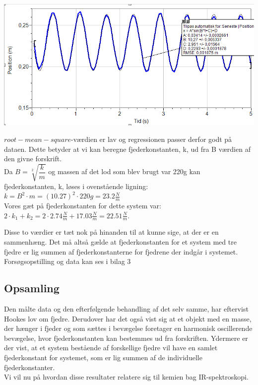 \begin{center}
\includegraphics[scale=0.7]{Billeder/graf4}
\end{center}

$root-mean-square$-værdien er lav og regressionen passer derfor godt på dataen. Dette betyder at vi kan beregne fjederkonstanten, k, ud fra B værdien af den givne forskrift.
\\

Da $B=\sqrt[2]{\dfrac{k}{m}}$ og massen af det lod som blev brugt var 220g kan fjederkonstanten, k, løses i ovenstående ligning:
\\

$k=B^2 \cdot m = (10.27)^2 \cdot 220g = 23.2 \frac{N}{m}$
\\

Vores gæt på fjederkonstanten for dette system var: $2 \cdot k_1 + k_2 = 2 \cdot 2.74 \frac{N}{m} + 17.03 \frac{N}{m} = 22.51 \frac{N}{m}$. 

Disse to værdier er tæt nok på hinanden til at kunne sige, at der er en sammenhæng. Det må altså gælde at fjederkonstanten for et system med tre fjedre er lig summen af fjederkonstanterne for fjedrene der indgår i systemet. Forsøgsopstilling og data kan ses i bilag 3
\\

\subsection{Opsamling}\label{sec:del}
Den målte data og den efterfølgende behandling af det selv samme, har eftervist Hookes lov om fjedre. Derudover har det også vist sig at et objekt med en masse, der hænger i fjeder og som sættes i bevægelse foretager en harmonisk oscillerende bevægelse, hvor fjederkonstanten kan bestemmes ud fra forskriften. Ydermere er der vist, at et system bestående af forskellige fjedre vil have en samlet fjederkonstant for systemet, som er lig summen af de individuelle fjederkonstanter.
\\

Vi vil nu på hvordan disse resultater relatere sig til kemien bag IR-spektroskopi.